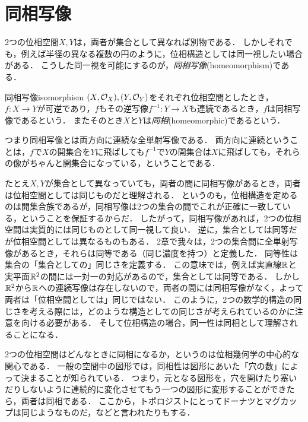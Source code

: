 \documentclass[11pt,a4paper, dvipdfmx]{jsarticle}
\begin{document}

\section{同相写像}
2つの位相空間$X, Y$は，両者が集合として異なれば別物である．
しかしそれでも，例えば半径の異なる複数の円のように，位相構造としては同一視したい場合がある．
こうした同一視を可能にするのが，\emph{同相写像}(homeomorphism)である．


\begin{dfn}{同相写像}{isomorphism}
  $(X, \mathcal{O}_X), (Y, \mathcal{O}_Y)$をそれぞれ位相空間としたとき，$f:X \to Y$が可逆であり，$f$もその逆写像$f^{-1}:Y \to X$も連続であるとき，$f$は同相写像であるという．
  またそのとき$X$と$Y$は\emph{同相}(homeomorphic)であるという．
\end{dfn}

つまり同相写像とは両方向に連続な全単射写像である．
両方向に連続ということは，$f$で$X$の開集合を$Y$に飛ばしても$f^{-1}$で$Y$の開集合は$X$に飛ばしても，それらの像がちゃんと開集合になっている，ということである．

たとえ$X, Y$が集合として異なっていても，両者の間に同相写像があるとき，両者は位相空間としては同じものだと理解される．
というのも，位相構造を定めるのは開集合族であるが，同相写像は2つの集合の間でこれが正確に一致している，ということを保証するからだ．
したがって，同相写像があれば，2つの位相空間は実質的には同じものとして同一視して良い．
逆に，集合としては同等だが位相空間としては異なるものもある．
2章で我々は，2つの集合間に全単射写像があるとき，それらは同等である（同じ濃度を持つ）と定義した．
同等性は集合の「集合としての」同じさを定義する．
この意味では，例えば実直線$\mathbb{R}$と実平面$\mathbb{R}^2$の間には一対一の対応があるので，集合としては同等である．
しかし$\mathbb{R}^2$から$\mathbb{R}$への連続写像は存在しないので，両者の間には同相写像がなく，よって両者は「位相空間としては」同じではない．
このように，2つの数学的構造の同じさを考える際には，どのような構造としての同じさが考えられているのかに注意を向ける必要がある．
そして位相構造の場合，同一性は同相として理解されることになる．


\begin{develop}
2つの位相空間はどんなときに同相になるか，というのは位相幾何学の中心的な関心である．
一般の空間中の図形では，同相性は図形にあいた「穴の数」によって決まることが知られている．
つまり，元となる図形を，穴を開けたり塞いだりしないように連続的に変化させてもう一つの図形に変形することができたら，両者は同相である．
ここから，トポロジストにとってドーナツとマグカップは同じようなものだ，などと言われたりもする．
\end{develop}
\end{document}
